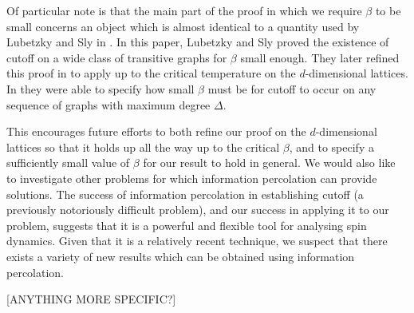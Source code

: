Of particular note is that the main part of the proof in which we require $\beta$ to be small concerns an object which is almost identical to a quantity used by Lubetzky and Sly in \cite{Lubetzky2015-po}. In this paper, Lubetzky and Sly proved the existence of cutoff on a wide class of transitive graphs for $\beta$ small enough. They later refined this proof in \cite{Lubetzky2016-wd} to apply up to the critical temperature on the $d$-dimensional lattices. In \cite{Lubetzky2017-nc} they were able to specify how small $\beta$ must be for cutoff to occur on any sequence of graphs with maximum degree $\Delta$.

This encourages future efforts to both refine our proof on the $d$-dimensional lattices so that it holds up all the way up to the critical $\beta$, and to specify a sufficiently small value of $\beta$ for our result to hold in general.
We would also like to investigate other problems for which information percolation can provide solutions. The success of information percolation in establishing cutoff (a previously notoriously difficult problem), and our success in applying it to our problem, suggests that it is a powerful and flexible tool for analysing spin dynamics. Given that it is a relatively recent technique, we suspect that there exists a variety of new results which can be obtained using information percolation.

[ANYTHING MORE SPECIFIC?]